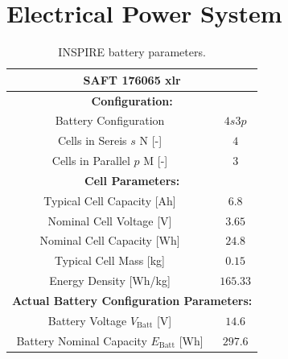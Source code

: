 \section{Electrical Power System} \label{sec:AppendixEPS}
\begin{table}[htb]
\centering
\caption{INSPIRE battery parameters.}
\begin{tabular}{|c|c|}
\hline
\multicolumn{2}{|c|}{\textbf{SAFT 176065 xlr} \cite{SAFTBatteries.2018}}                                                                \\ \hline
\multicolumn{2}{|c|}{\textbf{Configuration:}}                                                                 \\ \hline
Battery Configuration                                                           & $4s3p$                        \\ \hline
Cells in Sereis $s$ N [-]                                                       & $4$                           \\ \hline
Cells in Parallel $p$ M [-]                                                     & $3$                           \\ \hline
\multicolumn{2}{|c|}{\textbf{Cell Parameters:}}                                                               \\ \hline
Typical Cell Capacity   [Ah]                                                    & $6.8$                         \\ \hline
Nominal Cell Voltage [V]                                                        & $3.65$                        \\ \hline
Nominal Cell Capacity [Wh]                                                      & $24.8$                        \\ \hline
Typical Cell Mass [kg]                                                          & $0.15$                        \\ \hline
Energy Density [Wh/kg]                                                     & $165.33$                      \\ \hline
\multicolumn{2}{|c|}{\textbf{Actual Battery Configuration Parameters:}}                                       \\ \hline
Battery Voltage $V_\text{Batt}$ [V]                                             & $14.6$                        \\ \hline
Battery Nominal Capacity $E_\text{Batt}$ [Wh]                                   & $297.6$                       \\ \hline

\end{tabular}
\end{table}
